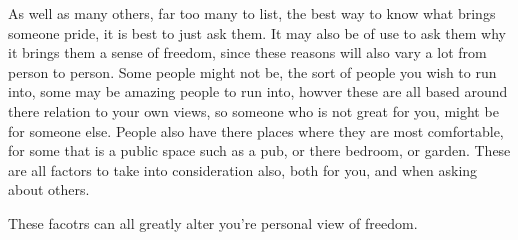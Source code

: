 \documentclass[../main.tex]{subfile}
\begin{document}
As well as many others, far too many to list, the best way to know what brings someone pride, it is best to just ask them. It may also be of use to ask them why it brings them a sense of freedom, since these reasons will also vary a lot from person to person. Some people might not be, the sort of people you wish to run into, some may be amazing people to run into, howver these are all based around there relation to your own views, so someone who is not great for you, might be for someone else. People also have there places where they are most comfortable, for some that is a public space such as a pub, or there bedroom, or garden. These are all factors to take into consideration also, both for you, and when asking about others.

These facotrs can all greatly alter you're personal view of freedom.
\end{document}
